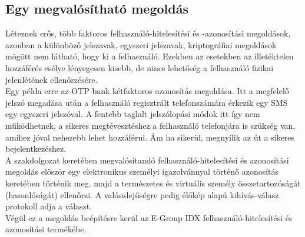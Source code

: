 \subsection{Egy megvalósítható megoldás}
Léteznek erős, több faktoros felhasználó-hitelesítési és -azonosítási megoldások, azonban a különböző jelszavak, egyszeri jelszavak, kriptográfiai megoldások mögött nem látható, hogy ki a felhasználó. Ezekben az esetekben az illetéktelen hozzáférés esélye lényegesen kisebb, de nincs lehetőség a felhasználó fizikai jelenlétének ellenőrzésére. 
\\Egy példa erre az OTP bank kétfaktoros azonosítás megoldása. Itt a megfelelő jelszó megadása után a felhasználó regisztrált telefonszámára érkezik egy SMS egy egyszeri jelszóval. A fentebb taglalt jelszólopási módok itt így nem működhetnek, a sikeres megtévesztéshez a felhasználó telefonjára is szükség van, amihez jóval nehezebb lehet hozzáférni. Ám ha sikerül, megnyílik az út a sikeres bejelentkezéshez.
\\A szakdolgozat keretében megvalósítandó felhasználó-hitelesítési és azonosítási megoldás először egy elektronikus személyi igazolvánnyal történő azonosítás keretében történik meg, majd a természetes és virtuális személy összetartozóságát (hasonlóságát) ellenőrzi. A valósidejűségre pedig élőkép alapú kihívás-válasz protokoll adja a választ.
\\Végül ez a megoldás beépítésre kerül az E-Group IDX felhasználó-hitelesítési és azonosítási termékébe.